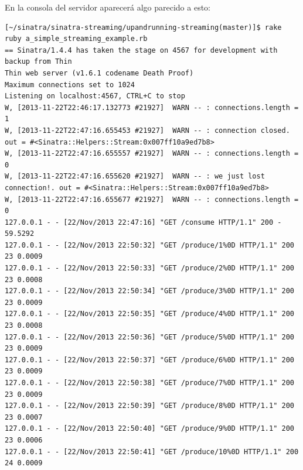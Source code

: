En la consola del servidor aparecerá algo 
parecido a esto:
\begin{verbatim}
[~/sinatra/sinatra-streaming/upandrunning-streaming(master)]$ rake
ruby a_simple_streaming_example.rb
== Sinatra/1.4.4 has taken the stage on 4567 for development with backup from Thin
Thin web server (v1.6.1 codename Death Proof)
Maximum connections set to 1024
Listening on localhost:4567, CTRL+C to stop
W, [2013-11-22T22:46:17.132773 #21927]  WARN -- : connections.length = 1
W, [2013-11-22T22:47:16.655453 #21927]  WARN -- : connection closed. out = #<Sinatra::Helpers::Stream:0x007ff10a9ed7b8>
W, [2013-11-22T22:47:16.655557 #21927]  WARN -- : connections.length = 0
W, [2013-11-22T22:47:16.655620 #21927]  WARN -- : we just lost  connection!. out = #<Sinatra::Helpers::Stream:0x007ff10a9ed7b8>
W, [2013-11-22T22:47:16.655677 #21927]  WARN -- : connections.length = 0
127.0.0.1 - - [22/Nov/2013 22:47:16] "GET /consume HTTP/1.1" 200 - 59.5292
127.0.0.1 - - [22/Nov/2013 22:50:32] "GET /produce/1%0D HTTP/1.1" 200 23 0.0009
127.0.0.1 - - [22/Nov/2013 22:50:33] "GET /produce/2%0D HTTP/1.1" 200 23 0.0008
127.0.0.1 - - [22/Nov/2013 22:50:34] "GET /produce/3%0D HTTP/1.1" 200 23 0.0009
127.0.0.1 - - [22/Nov/2013 22:50:35] "GET /produce/4%0D HTTP/1.1" 200 23 0.0008
127.0.0.1 - - [22/Nov/2013 22:50:36] "GET /produce/5%0D HTTP/1.1" 200 23 0.0009
127.0.0.1 - - [22/Nov/2013 22:50:37] "GET /produce/6%0D HTTP/1.1" 200 23 0.0009
127.0.0.1 - - [22/Nov/2013 22:50:38] "GET /produce/7%0D HTTP/1.1" 200 23 0.0009
127.0.0.1 - - [22/Nov/2013 22:50:39] "GET /produce/8%0D HTTP/1.1" 200 23 0.0007
127.0.0.1 - - [22/Nov/2013 22:50:40] "GET /produce/9%0D HTTP/1.1" 200 23 0.0006
127.0.0.1 - - [22/Nov/2013 22:50:41] "GET /produce/10%0D HTTP/1.1" 200 24 0.0009
\end{verbatim}

